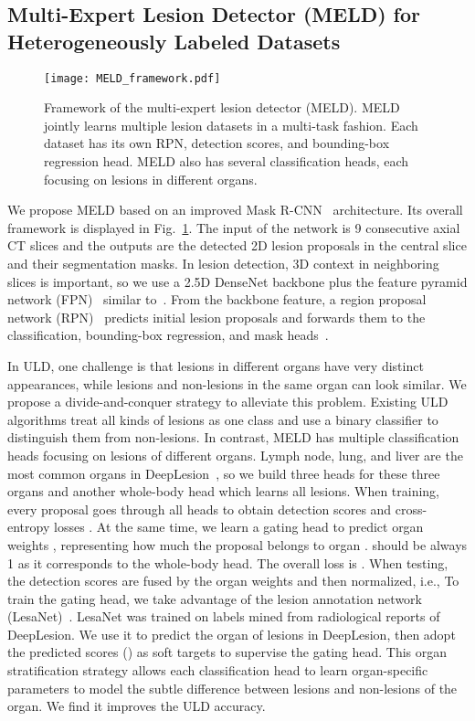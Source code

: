 \documentclass[runningheads]{llncs}
\def\Fig#1{{Fig.~\ref{fig:#1}}}
\begin{document}
\subsection{Multi-Expert Lesion Detector (MELD) for Heterogeneously Labeled Datasets}
\label{subsec:MELD}

\begin{figure}[t]
	\centering
	\texttt{[image: MELD\_framework.pdf]} \caption{Framework of the multi-expert lesion detector (MELD). MELD jointly learns multiple lesion datasets in a multi-task fashion. Each dataset  has its own RPN, detection scores, and bounding-box regression head. MELD also has several classification heads, each focusing on lesions in different organs.}
	\label{fig:MELD_framework} \vspace{-3mm}
\end{figure}

We propose MELD based on an improved Mask R-CNN~\cite{He2017MaskRCNN} architecture. Its overall framework is displayed in \Fig{MELD_framework}. The input of the network is 9 consecutive axial CT slices and the outputs are the detected 2D lesion proposals in the central slice and their segmentation masks. In lesion detection, 3D context in neighboring slices is important, so we use a 2.5D DenseNet backbone plus the feature pyramid network (FPN)~\cite{Lin2016Pyramid} similar to~\cite{Yan2019MULAN}. From the backbone feature, a region proposal network (RPN)~\cite{Ren2015faster} predicts initial lesion proposals and forwards them to the classification, bounding-box regression, and mask heads~\cite{He2017MaskRCNN}. 

In ULD, one challenge is that lesions in different organs have very distinct appearances, while lesions and non-lesions in the same organ can look similar. We propose a divide-and-conquer strategy to alleviate this problem. Existing ULD algorithms treat all kinds of lesions as one class and use a binary classifier to distinguish them from non-lesions. In contrast, MELD has multiple classification heads focusing on lesions of different organs. Lymph node, lung, and liver are the most common organs in DeepLesion~\cite{Yan2019Lesa}, so we build three heads for these three organs and another whole-body head which learns  all lesions. When training, every proposal goes through all heads to obtain detection scores  and cross-entropy losses . At the same time, we learn a gating head to predict organ weights , representing how much the proposal belongs to organ .  should be always 1 as it corresponds to the whole-body head. The overall loss is .
When testing, the detection scores are fused by the organ weights and then normalized, i.e., 
To train the gating head, we take advantage of the lesion annotation network (LesaNet)~\cite{Yan2019Lesa}. LesaNet was trained on labels mined from radiological reports of DeepLesion. We use it to predict the organ of lesions in DeepLesion, then adopt the predicted scores () as soft targets to supervise the gating head. This organ stratification strategy allows each classification head to learn organ-specific parameters to model the subtle difference between lesions and non-lesions of the organ. We find it improves the ULD accuracy.
\end{document}

